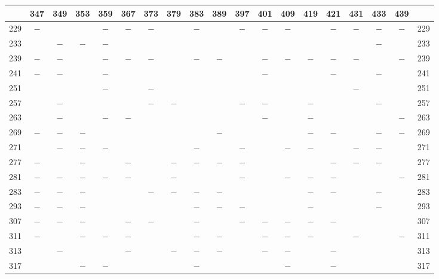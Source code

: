\clearpage
{}%
\begin{center}\begingroup\fontsize{8}{10.5}\selectfont\setlength{\tabcolsep}{2pt}
\begin{tabular}{r|c|c|c|c|c|c|c|c|c|c|c|c|c|c|c|c|c|r}
\hline
 & 347 & 349 & 353 & 359 & 367 & 373 & 379 & 383 & 389 & 397 & 401 & 409 & 419 & 421 & 431 & 433 & 439 & \\
\hline
229 & $-$ &  &  & $-$ & $-$ & $-$ &  & $-$ &  & $-$ & $-$ & $-$ &  & $-$ & $-$ & $-$ & $-$ & 229\\
233 &  & $-$ & $-$ & $-$ &  &  &  &  &  &  &  &  &  &  &  & $-$ &  & 233\\
239 & $-$ & $-$ &  & $-$ & $-$ & $-$ &  & $-$ & $-$ &  & $-$ & $-$ & $-$ & $-$ & $-$ &  & $-$ & 239\\
241 & $-$ & $-$ &  & $-$ &  &  &  &  &  &  & $-$ &  &  & $-$ &  & $-$ &  & 241\\
251 &  &  &  & $-$ &  & $-$ &  &  &  &  &  &  &  &  & $-$ &  &  & 251\\
257 &  & $-$ &  &  &  & $-$ & $-$ &  &  & $-$ & $-$ &  & $-$ &  &  & $-$ &  & 257\\
263 &  & $-$ &  & $-$ & $-$ &  &  &  &  &  & $-$ &  & $-$ &  &  &  & $-$ & 263\\
269 & $-$ & $-$ & $-$ &  &  &  &  &  & $-$ &  &  &  & $-$ & $-$ &  & $-$ & $-$ & 269\\
271 &  & $-$ & $-$ & $-$ &  &  &  & $-$ &  & $-$ &  & $-$ & $-$ &  & $-$ & $-$ &  & 271\\
277 & $-$ &  & $-$ &  & $-$ &  & $-$ & $-$ & $-$ & $-$ &  &  &  & $-$ & $-$ & $-$ &  & 277\\
281 & $-$ & $-$ & $-$ & $-$ & $-$ &  & $-$ &  &  & $-$ &  & $-$ & $-$ & $-$ &  &  & $-$ & 281\\
283 & $-$ & $-$ & $-$ &  &  & $-$ & $-$ & $-$ & $-$ &  &  &  & $-$ & $-$ &  & $-$ &  & 283\\
293 & $-$ & $-$ & $-$ &  &  &  &  & $-$ & $-$ & $-$ &  &  & $-$ &  &  & $-$ &  & 293\\
307 & $-$ & $-$ & $-$ &  & $-$ & $-$ &  & $-$ &  & $-$ & $-$ & $-$ & $-$ & $-$ &  &  &  & 307\\
311 & $-$ &  & $-$ & $-$ & $-$ &  &  & $-$ & $-$ &  & $-$ & $-$ & $-$ &  & $-$ &  & $-$ & 311\\
313 &  & $-$ &  &  & $-$ &  & $-$ & $-$ & $-$ &  & $-$ & $-$ &  & $-$ &  &  &  & 313\\
317 &  &  & $-$ & $-$ &  &  &  & $-$ &  &  &  & $-$ &  & $-$ &  &  &  & 317\\

\end{tabular}
\end{center}
